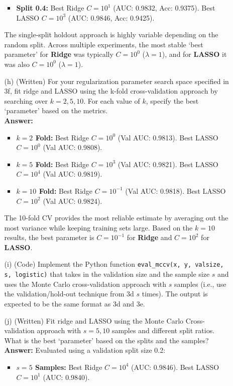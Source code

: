\documentclass[a4paper,12pt]{article}
\begin{document}
\begin{enumerate}
\begin{enumerate}
\begin{itemize}
            \item \textbf{Split 0.4:} Best Ridge $C = 10^1$ (AUC: 0.9832, Acc: 0.9375). Best LASSO $C = 10^3$ (AUC: 0.9846, Acc: 0.9425).
        \end{itemize}
        The single-split holdout approach is highly variable depending on the random split. Across multiple experiments, the most stable `best parameter' for \textbf{Ridge} was typically $C = 10^0$ ($\lambda = 1$), and for \textbf{LASSO} it was also $C = 10^0$ ($\lambda = 1$).
        \item[(h)] (Written) For your regularization parameter search space specified in 3f, fit ridge and LASSO using the k-fold cross-validation approach by searching over $k = 2, 5, 10$. For each value of $k$, specify the best `parameter' based on the metrics. \\
        \textbf{Answer:} 
        \begin{itemize}
            \item \textbf{$k=2$ Fold:} Best Ridge $C = 10^0$ (Val AUC: 0.9813). Best LASSO $C = 10^0$ (Val AUC: 0.9808).
            \item \textbf{$k=5$ Fold:} Best Ridge $C = 10^3$ (Val AUC: 0.9821). Best LASSO $C = 10^4$ (Val AUC: 0.9819).
            \item \textbf{$k=10$ Fold:} Best Ridge $C = 10^{-1}$ (Val AUC: 0.9818). Best LASSO $C = 10^2$ (Val AUC: 0.9824).
        \end{itemize}
        The 10-fold CV provides the most reliable estimate by averaging out the most variance while keeping training sets large. Based on the $k=10$ results, the best parameter is $C=10^{-1}$ for \textbf{Ridge} and $C=10^2$ for \textbf{LASSO}.
        \item[(i)] (Code) Implement the Python function \texttt{eval\_mccv(x, y, valsize, s, logistic)} that takes in the validation size and the sample size $s$ and uses the Monte Carlo cross-validation approach with $s$ samples (i.e., use the validation/hold-out technique from 3d $s$ times). The output is expected to be the same format as 3d and 3e.
        \item[(j)] (Written) Fit ridge and LASSO using the Monte Carlo Cross-validation approach with $s = 5, 10$ samples and different split ratios. What is the best `parameter' based on the splits and the samples? \\
        \textbf{Answer:} Evaluated using a validation split size 0.2:
        \begin{itemize}
            \item \textbf{$s=5$ Samples:} Best Ridge $C = 10^4$ (AUC: 0.9846). Best LASSO $C = 10^1$ (AUC: 0.9840).

\end{itemize}
\end{enumerate}
\end{enumerate}
\end{document}

